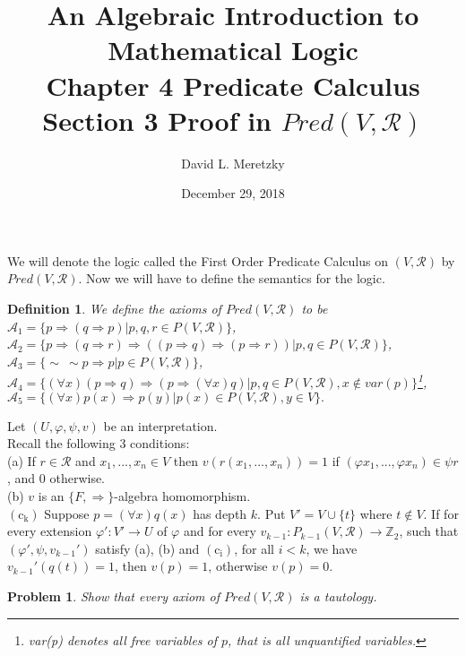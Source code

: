 \documentclass{article}
\title{ \vspace{-10ex} %
An Algebraic Introduction to Mathematical Logic\\
Chapter 4 Predicate Calculus \\
Section 3 Proof in $Pred(V, \mathscr{R})$ \\
}
\author{David L. Meretzky
}
\date{%
December 29, 2018
}
\theoremstyle{problemstyle}
\newtheorem{problem}{Problem}
\theoremstyle{lemmastyle}
\theoremstyle{theoremstyle}
\theoremstyle{problemstyle}
\newtheorem{definition}{Definition}
\begin{document}
\maketitle

We will denote the logic called the First Order Predicate Calculus on $(V,\mathscr{R})$ by $Pred(V,\mathscr{R})$. Now we will have to define the semantics for the logic. 

\begin{definition}
We define the axioms of $Pred(V,\mathscr{R})$ to be\\
$\mathscr{A}_1 = \{p\Rightarrow (q\Rightarrow p)|p,q,r \in P(V,\mathscr{R})\}$,\\
$\mathscr{A}_2 = \{p\Rightarrow (q\Rightarrow r) \Rightarrow ((p \Rightarrow q) \Rightarrow (p \Rightarrow r)) |p,q \in P(V,\mathscr{R})\}$,\\
$\mathscr{A}_3 = \{\sim \ \sim p\Rightarrow p|p \in P(V,\mathscr{R})\}$,\\
$\mathscr{A}_4 = \{(\forall x)(p\Rightarrow q)\Rightarrow (p \Rightarrow (\forall x) q)|p,q \in P(V,\mathscr{R}), x\notin var(p)\}$\footnote{var(p) denotes all free variables of $p$, that is all unquantified variables.},\\
$\mathscr{A}_5 = \{(\forall x)p(x)\Rightarrow p(y)|p(x) \in P(V,\mathscr{R}), y \in V\}.$
\end{definition}

Let $(U,\varphi, \psi, v)$ be an interpretation.\\

Recall the following 3 conditions:\\
(a) If $r \in \mathscr{R}$ and $x_1,...,x_n \in V$ then $v(r(x_1,...,x_n))=1$ if $(\varphi x_1,...,\varphi x_n) \in \psi r$, and $0$ otherwise.\\
(b) $v$ is an $\{F, \Rightarrow\}$-algebra homomorphism.\\
$(\text{c}_\text{k})$ Suppose $p = (\forall x)q(x)$ has depth $k$. Put $V' = V \cup \{t\}$ where $t \notin V$. If for every extension $\varphi':V' \rightarrow U$ of $\varphi$ and for every $v_{k-1}:P_{k-1}(V, \mathscr{R})\rightarrow \mathbb{Z}_2$, such that $(\varphi',\psi,v_{k-1}')$ satisfy (a), (b) and $(\text{c}_\text{i})$, for all $i < k$, we have $v_{k-1}'(q(t))=1$, then $v(p) = 1$, otherwise $v(p) = 0$.

\begin{problem}
Show that every axiom of $Pred(V, \mathscr{R})$ is a tautology. 
\end{problem}
\end{document}
